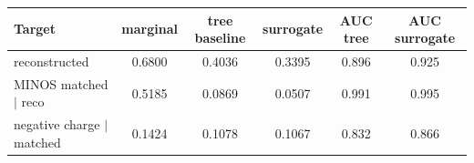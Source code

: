 \begin{tabular}{lccccc}
\toprule
Target & marginal & tree baseline & surrogate & AUC tree & AUC surrogate \\
\midrule
reconstructed & 0.6800 & 0.4036 & 0.3395 & 0.896 & 0.925 \\
MINOS matched $\mid$ reco & 0.5185 & 0.0869 & 0.0507 & 0.991 & 0.995 \\
negative charge $\mid$ matched & 0.1424 & 0.1078 & 0.1067 & 0.832 & 0.866 \\
\bottomrule
\end{tabular}
